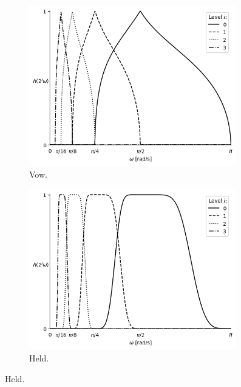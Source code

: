 \begin{figure}[H]
  \centering
  \begin{subfigure}[t]{.49\textwidth}
    \centering
    \includegraphics[width=0.99\textwidth]{Figures/chapter-wavelets/figures/profileMotherWavelet_Vow_5_Mother.png}
    \captionsetup{width=\textwidth}
    \caption{Vow.}
    \label{fig:mother_vow}
  \end{subfigure}%
  \begin{subfigure}[t]{.49\textwidth}
    \centering
    \includegraphics[width=0.99\textwidth]{Figures/chapter-wavelets/figures/profileMotherWavelet_Held_5_Mother.png}
    \captionsetup{width=\textwidth}
    \caption{Held.}
    \label{fig:mother_held}

\end{subfigure}
\end{figure}
